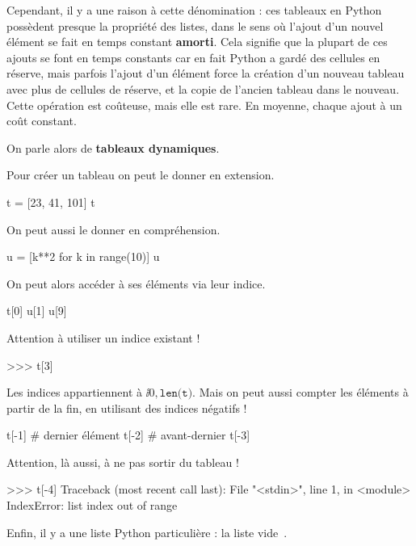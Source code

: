 Cependant, il y a une raison à cette dénomination : ces tableaux en Python possèdent presque 
la propriété des listes, dans le sens où l'ajout d'un nouvel élément se fait en temps constant 
\textbf{amorti}. Cela signifie que la plupart de ces ajouts se font en temps constants car en fait 
Python a \og gardé des cellules en réserve\fg, mais parfois l'ajout d'un élément force la création 
d'un nouveau tableau avec plus de cellules de réserve, et la copie de l'ancien tableau dans le 
nouveau. Cette opération est coûteuse, mais elle 
est rare. En moyenne, chaque ajout à un coût constant.

On parle alors de \textbf{tableaux dynamiques}.

\begin{multicols}{2}
Pour créer un tableau on peut le donner en extension.

\begin{pyconsole}
t = [23, 41, 101]
t
\end{pyconsole}

On peut aussi le donner en compréhension.

\begin{pyconsole}
u = [k**2 for k in range(10)]
u
\end{pyconsole}
On peut alors accéder à ses éléments via leur indice.
\begin{pyconsole}
t[0]
u[1]
u[9]
\end{pyconsole}

Attention à utiliser un indice existant !
\begin{pyconsole}
>>> t[3]
\end{pyconsole}

Les indices appartiennent à $\ii{0,\texttt{len(t)}}$.
Mais on peut aussi compter les éléments à partir de la fin, en utilisant des indices négatifs !
\begin{pyconsole}
t[-1] # dernier élément
t[-2] # avant-dernier
t[-3]
\end{pyconsole}

Attention, là aussi, à ne pas sortir du tableau !

\begin{pyverbatim}
>>> t[-4]
Traceback (most recent call last):
  File "<stdin>", line 1, in <module>
IndexError: list index out of range
\end{pyverbatim}

Enfin, il y a une liste Python particulière : la liste vide~\pyv{[]}.

\end{multicols}


